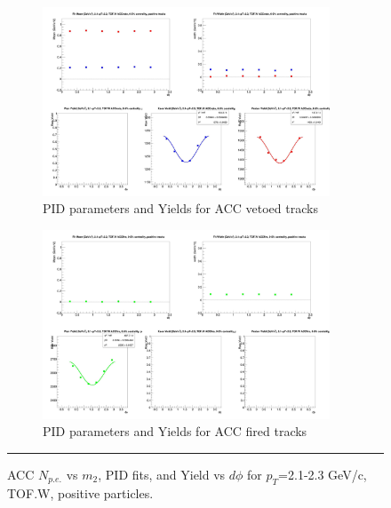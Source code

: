 \begin{figure}[H]
  \ContinuedFloat
    \begin{subfigure}{1\textwidth}
   \centering
   \includegraphics[width=0.94\textwidth]{hiptfits/pos/fitParams_tof2_cent0_ch1_pT-21-23.jpg}
    \caption{PID parameters and Yields for ACC vetoed tracks}
    \end{subfigure}    
    \begin{subfigure}{1\textwidth}
   \centering
   \includegraphics[width=0.94\textwidth]{hiptfits/pos/fitParams_tof3_cent0_ch1_pT-21-23.jpg}
    \caption{PID parameters and Yields for ACC fired tracks}
    \end{subfigure} 
    \rule{35em}{0.5pt}
  \caption[ACC $N_{p.e.}$ vs $m_2$, PID fits, and Yield vs $d\phi$ for $p_T$=2.1-2.3 GeV/c, TOF.W, positive particles.]{ACC $N_{p.e.}$ vs $m_2$, PID fits, and Yield vs $d\phi$ for $p_T$=2.1-2.3 GeV/c, TOF.W, positive particles.}
  \label{fig:acc21-23pos}
\end{figure}


